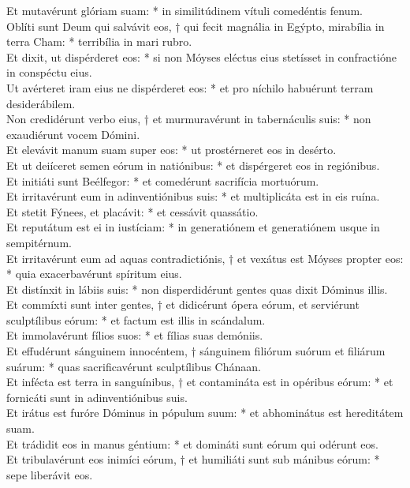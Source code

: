 {	Et mutavérunt glóriam suam: * in similitúdinem vítuli comedéntis fenum. \\
	Oblíti sunt Deum qui salvávit eos, † qui fecit magnália in Egýpto, mirabília in terra Cham: * terribília in mari rubro. \\
	Et dixit, ut dispérderet eos: * si non Móyses eléctus eius stetísset in confractióne in conspéctu eius. \\
	Ut avérteret iram eius ne dispérderet eos: * et pro níchilo habuérunt terram desiderábilem. \\
	Non credidérunt verbo eius, † et murmuravérunt in tabernáculis suis: * non exaudiérunt vocem Dómini. \\
	Et elevávit manum suam super eos: * ut prostérneret eos in desérto. \\
	Et ut deiíceret semen eórum in natiónibus: * et dispérgeret eos in regiónibus. \\
	Et initiáti sunt Beélfegor: * et comedérunt sacrifícia mortuórum. \\
	Et irritavérunt eum in adinventiónibus suis: * et multiplicáta est in eis ruína. \\
	Et stetit Fýnees, et placávit: * et cessávit quassátio. \\
	Et reputátum est ei in iustíciam: * in generatiónem et generatiónem usque in sempitérnum. \\
	Et irritavérunt eum ad aquas contradictiónis, † et vexátus est Móyses propter eos: * quia exacerbavérunt spíritum eius. \\
	Et distínxit in lábiis suis: * non disperdidérunt gentes quas dixit Dóminus illis. \\
	Et commíxti sunt inter gentes, † et didicérunt ópera eórum, et serviérunt sculptílibus eórum: * et factum est illis in scándalum. \\
	Et immolavérunt fílios suos: * et fílias suas demóniis. \\
	Et effudérunt sánguinem innocéntem, † sánguinem filiórum suórum et filiárum suárum: * quas sacrificavérunt sculptílibus Chánaan. \\
	Et infécta est terra in sanguínibus, † et contamináta est in opéribus eórum: * et fornicáti sunt in adinventiónibus suis. \\
	Et irátus est furóre Dóminus in pópulum suum: * et abhominátus est hereditátem suam. \\
	Et trádidit eos in manus géntium: * et domináti sunt eórum qui odérunt eos. \\
	Et tribulavérunt eos inimíci eórum, † et humiliáti sunt sub mánibus eórum: * sepe liberávit eos. \\
}
